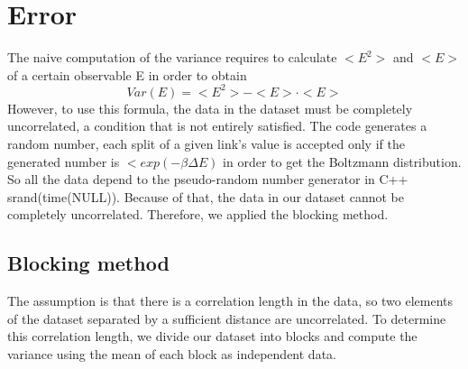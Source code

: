 \section{Error}
        The naive computation of the variance requires to calculate $< E^2 >$ and $<E>$ of a certain observable E in order to obtain
        $$ Var(E)=<E^2>-<E>\cdot<E>$$
        However, to use this formula, the data in the dataset must be completely uncorrelated, a condition that is not entirely satisfied.
        The code generates a random number, each split of a given link's value is accepted only if the generated number is $<exp(-\beta\Delta E)$ 
        in order to get the Boltzmann distribution.
        So all the data depend to the pseudo-random number generator in C++ srand(time(NULL)). 
        \noindent
        Because of that, the data in our dataset cannot be completely uncorrelated. Therefore, we applied the blocking method.
        
        \subsection{Blocking method}
            \noindent
            The assumption is that there is a correlation length in the data, so two elements of the dataset separated by a sufficient distance are uncorrelated.
            To determine this correlation length, we divide our dataset into blocks and compute the variance using the mean of each block as independent data. \\
            
